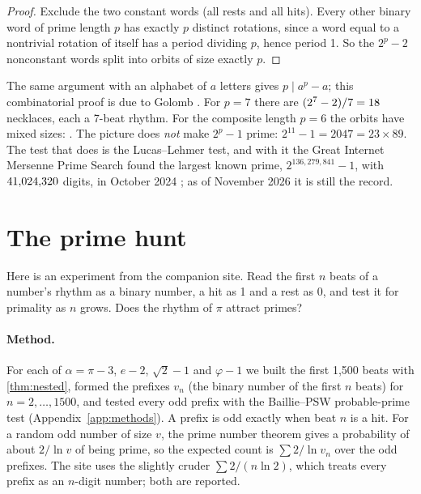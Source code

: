 \begin{proof}
Exclude the two constant words (all rests and all hits). Every other binary word of prime length $p$ has exactly $p$ distinct rotations, since a word equal to a nontrivial rotation of itself has a period dividing $p$, hence period 1. So the $2^p - 2$ nonconstant words split into orbits of size exactly $p$.
\end{proof}

The same argument with an alphabet of $a$ letters gives $p \mid a^p - a$; this combinatorial proof is due to Golomb \citep{Golomb1956}. For $p = 7$ there are $(2^7 - 2)/7 = 18$ necklaces, each a 7-beat rhythm. For the composite length $p = 6$ the orbits have mixed sizes: \OrbitsSix. The picture does \emph{not} make $2^p - 1$ prime: $2^{11} - 1 = 2047 = 23 \times 89$. The test that does is the Lucas--Lehmer test, and with it the Great Internet Mersenne Prime Search found the largest known prime, $2^{136{,}279{,}841} - 1$, with $41{,}024{,}320$ digits, in October 2024 \citep{GIMPS2024}; as of November 2026 it is still the record. \addedon{\revC}

\section{The prime hunt}\label{sec:hunt}

Here is an experiment from the companion site. Read the first $n$ beats of a number's rhythm as a binary number, a hit as 1 and a rest as 0, and test it for primality as $n$ grows. Does the rhythm of $\pi$ attract primes?

\paragraph{Method.} For each of $\alpha = \pi - 3$, $e - 2$, $\sqrt2 - 1$ and $\varphi - 1$ we built the first 1{,}500 beats with \cref{thm:nested}, formed the prefixes $v_n$ (the binary number of the first $n$ beats) for $n = 2, \dots, 1500$, and tested every odd prefix with the Baillie--PSW probable-prime test (Appendix~\ref{app:methods}). A prefix is odd exactly when beat $n$ is a hit. For a random odd number of size $v$, the prime number theorem gives a probability of about $2/\ln v$ of being prime, so the expected count is $\sum 2/\ln v_n$ over the odd prefixes. The site uses the slightly cruder $\sum 2/(n \ln 2)$, which treats every prefix as an $n$-digit number; both are reported.

